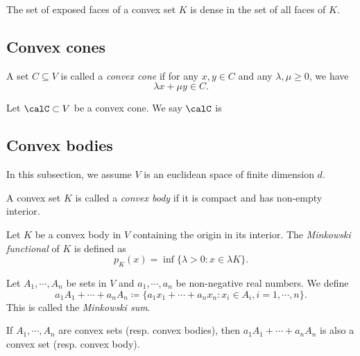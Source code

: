   \begin{theorem}
    The set of exposed faces of a convex set $K$ is dense in the set of all faces of $K$.
    \Yang{}
  \end{theorem}

\subsection{Convex cones}

  \begin{definition}
    A set $C \subseteq V$ is called a \emph{convex cone} if for any $x, y \in C$ and any $\lambda, \mu \geq 0$, we have
    \[\lambda x + \mu y \in C.\]
    \Yang{}
  \end{definition}

  \begin{definition}
    Let $\calC \subset V$ be a convex cone.
    We say $\calC$ is 
     \Yang{}
  \end{definition}


\subsection{Convex bodies}

  In this subsection, we assume $V$ is an euclidean space of finite dimension $d$.

  \begin{definition}
    A convex set $K$ is called a \emph{convex body} if it is compact and has non-empty interior.
  \end{definition}

  \begin{example}
    Let $K$ be a convex body in $V$ containing the origin in its interior.
    The \emph{Minkowski functional} of $K$ is defined as
    \[p_K(x) = \inf\{\lambda > 0 : x \in \lambda K\}.\]
    
  \end{example}

  \begin{definition}
    Let $A_1, \cdots, A_n$ be sets in $V$ and $a_1, \cdots, a_n$ be non-negative real numbers.
    We define
    \[a_1 A_1 + \cdots + a_n A_n \coloneq \{a_1 x_1 + \cdots + a_n x_n : x_i \in A_i, i = 1, \cdots, n\}.\]
    This is called the \emph{Minkowski sum}.
  \Yang{}
  \end{definition}

  \begin{proposition}
    If $A_1, \cdots, A_n$ are convex sets (resp. convex bodies), then $a_1 A_1 + \cdots + a_n A_n$ is also a convex set (resp. convex body).
  \end{proposition}

